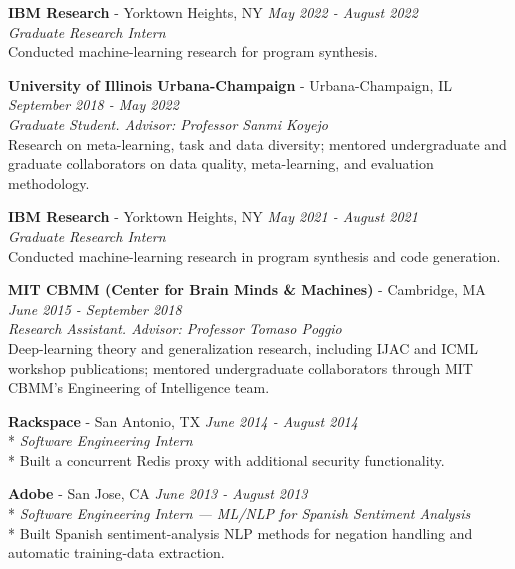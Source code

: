 \documentclass{article}
\newenvironment{changemargin}[2]{%
  \begin{list}{}{%
    \setlength{\topsep}{0pt}%
    \setlength{\leftmargin}{#1}%
    \setlength{\rightmargin}{#2}%
    \setlength{\listparindent}{\parindent}%
    \setlength{\itemindent}{\parindent}%
    \setlength{\parsep}{\parskip}%
  }%
  \item[]}{\end{list}
}
\newenvironment{body} {
		\vspace*{-16pt}
		\begin{changemargin}{-0.25in}{-0.5in}
	  }
		{\end{changemargin}\vspace{8pt plus 12pt}
	}
\begin{document}
\begin{body}
	\textbf{IBM Research} - Yorktown Heights, NY \hfill \emph{May 2022 - August 2022}\\
	\emph{Graduate Research Intern}\\
	Conducted machine-learning research for program synthesis.\\
	\vspace{8pt}

	\textbf{University of Illinois Urbana-Champaign} - Urbana-Champaign, IL \hfill \emph{September 2018 - May 2022}\\
	\emph{Graduate Student. Advisor: Professor Sanmi Koyejo}\\
	Research on meta-learning, task and data diversity; mentored undergraduate and graduate collaborators on data quality, meta-learning, and evaluation methodology.\\
	\vspace{8pt}

	\textbf{IBM Research} - Yorktown Heights, NY \hfill \emph{May 2021 - August 2021}\\
	\emph{Graduate Research Intern}\\
	Conducted machine-learning research in program synthesis and code generation.\\
	\vspace{8pt}

	\textbf{MIT CBMM (Center for Brain Minds \& Machines)} - Cambridge, MA \hfill \emph{June 2015 - September 2018}\\
	\emph{Research Assistant. Advisor: Professor Tomaso Poggio}\\
	Deep-learning theory and generalization research, including IJAC and ICML workshop publications; mentored undergraduate collaborators through MIT CBMM's Engineering of Intelligence team.\\
	\vspace{8pt}

	\textbf{Rackspace} - San Antonio, TX \hfill \emph{June 2014 - August 2014}\\*
	\emph{Software Engineering Intern}\\*
	Built a concurrent Redis proxy with additional security functionality.\\
	\vspace{8pt}

	\textbf{Adobe} - San Jose, CA \hfill \emph{June 2013 - August 2013}\\*
	\emph{Software Engineering Intern --- ML/NLP for Spanish Sentiment Analysis}\\*
	Built Spanish sentiment-analysis NLP methods for negation handling and automatic training-data extraction.\\


\end{body}
\end{document}
